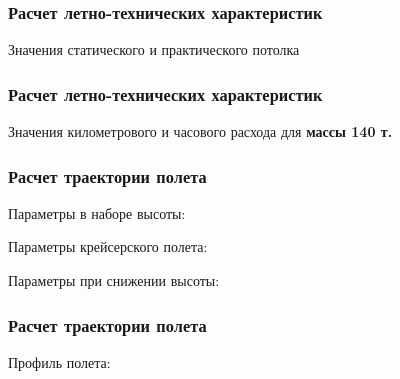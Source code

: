 \documentclass{beamer}
\begin{document}
\begin{frame}[t]
    \frametitle{Расчет летно-технических характеристик}
    \begin{center}
        Значения статического и практического потолка
        \resizebox{.70\linewidth}{!}{}
    \end{center}
\end{frame}
\begin{frame}[t]
    \frametitle{Расчет летно-технических характеристик}
    \begin{center}
        Значения километрового и часового расхода для \textbf{массы 140 т.}
        \resizebox{.70\linewidth}{!}{}
    \end{center}
\end{frame}
\begin{frame}[t]
    \frametitle{Расчет траектории полета}

    \begin{center}
        Параметры в наборе высоты:

        
        \vfill

        Параметры крейсерского полета:

        
        \vfill
        Параметры  при снижении высоты:

        
    \end{center}
\end{frame}

\begin{frame}[t]
    \frametitle{Расчет траектории полета}
    \begin{center}
        Профиль полета:

        \resizebox{.70\linewidth}{!}{}
    \end{center}
\end{frame}
\end{document}
